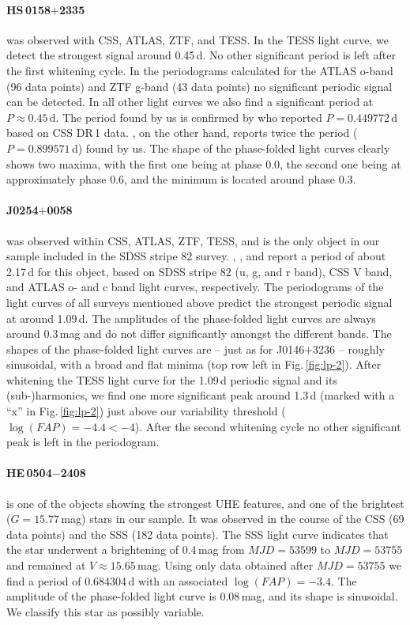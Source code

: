 \documentclass{aa}
\newcommand{\fg}[1]{\mbox{Fig.\,\ref{#1}}}
\begin{document}
\paragraph{HS\,0158$+$2335} was observed with CSS, ATLAS, ZTF, and TESS.
In the TESS light curve, we detect the strongest signal around 0.45\,d.
No other significant period is left after the first whitening cycle.
In the periodograms calculated for the ATLAS o-band (96 data points) and ZTF
g-band (43 data points) no significant periodic signal can be detected. In all
other light curves we also find a significant period at $P\approx 0.45$\,d.
The period found by us is confirmed by \cite{Drake+2014} who reported
$P=0.449772$\,d based on CSS DR\,1 data. \cite{Heinze+2018}, on the other
hand, reports twice the period ($P=0.899571$\,d) found by us.
The shape of the phase-folded light curves clearly shows two maxima, with
the first one being at phase 0.0, the second one being at approximately phase
0.6, and the minimum is located around phase 0.3.
\paragraph{J0254$+$0058} was observed within CSS, ATLAS, ZTF, TESS, and is
the only object in our sample included in the SDSS stripe 82 survey.
\cite{Becker+2011}, \cite{Drake+2014}, and \cite{Heinze+2018} report a period of about
2.17\,d for this object, based on SDSS stripe 82 (u, g, and r band),
CSS V band, and ATLAS o- and c band light curves, respectively.
The periodograms of the light curves of all surveys mentioned above predict
the strongest periodic signal at around 1.09\,d. The amplitudes of the
phase-folded light curves are always around 0.3\,mag and do not differ
significantly amongst the different bands. The shapes of the phase-folded
light curves are -- just as for J0146$+$3236 -- roughly sinusoidal, with a
broad and flat minima (top row left in \fg{fig:lp-2}). After whitening the TESS
light curve for the 1.09\,d periodic signal and its
(sub-)harmonics, we find one more significant peak around 1.3\,d (marked with
a ``x'' in \fg{fig:lp-2}) just above our variability threshold
($\log(FAP)=-4.4<-4$). After the second whitening cycle no other significant
peak is left in the periodogram.
\paragraph{HE\,0504$-$2408} is one of the objects showing the strongest UHE
features, and one of the brightest ($G=15.77$\,mag) stars in our sample. It
was observed in the course of the CSS (69 data points) and the
SSS (182 data points). The SSS light curve indicates that the star underwent a
brightening of 0.4\,mag from $MJD=53599$ to $MJD=53755$ and remained at
$V\approx15.65$\,mag. Using only data obtained after $MJD=53755$ we find a
period of 0.684304\,d with an associated $\log(FAP)=-3.4$. The amplitude of
the phase-folded light curve is 0.08\,mag, and its shape is sinusoidal.
We classify this star as possibly variable.
\end{document}
